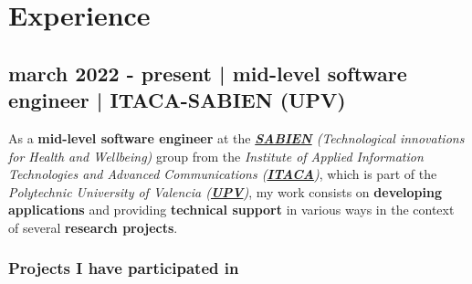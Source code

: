 \documentclass[letterpaper, 12pt, dvipsnames]{article}
\newcommand{\uniFull}{Polytechnic University of Valencia}
\newcommand{\uniUrl}{https://www.upv.es/es}
\newcommand{\sabienUrl}{http://www.sabien.upv.es/}
\begin{document}
\begin{adjustwidth}{-1.5cm}{}
\end{adjustwidth}

\pagebreak

\section*{Experience}

\subsection*{march 2022 - present | mid-level software engineer | ITACA-SABIEN (UPV)}

As a \textbf{mid-level software engineer} at the \emph{\textbf{\href{\sabienUrl}{SABIEN}} (Technological innovations for Health and Wellbeing)} group from the \emph{Institute of Applied Information Technologies and Advanced Communications (\textbf{\href{http://www.itaca.upv.es/}{ITACA}})}, which is part of the \emph{{\uniFull} (\textbf{\href{\uniUrl}{UPV}})}, my work consists on \textbf{developing applications} and providing \textbf{technical support} in various ways in the context of several \textbf{research projects}.

\subsubsection*{Projects I have participated in}
\end{document}
